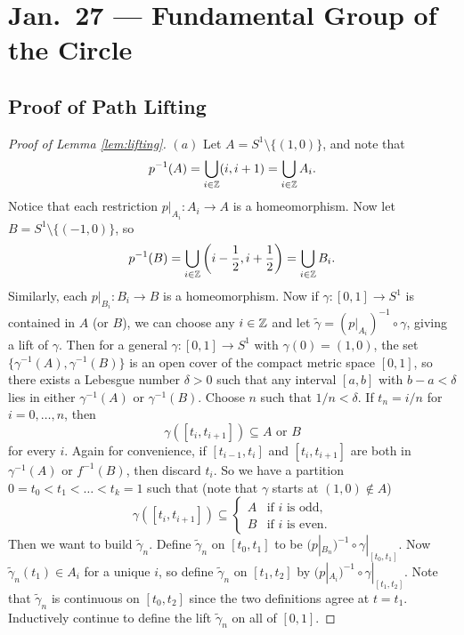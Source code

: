 \chapter{Jan.~27 --- Fundamental Group of the Circle}

\section{Proof of Path Lifting}

\begin{proof}[Proof of Lemma \ref{lem:lifting}]
  $(a)$ Let $A = S^1 \setminus \{(1, 0)\}$, and note that
  \[
    p^{-1}(A) = \bigcup_{i \in \mathbb{Z}} (i, i + 1) = \bigcup_{i \in \mathbb{Z}} A_i.
  \]
  Notice that each restriction
  $p|_{A_i} : A_i \to A$ is a homeomorphism.
  Now let $B = S^1 \setminus \{(-1, 0)\}$, so
  \[
    p^{-1}(B) = \bigcup_{i \in \mathbb{Z}} \left(i - \frac{1}{2}, i + \frac{1}{2}\right)
    = \bigcup_{i \in \mathbb{Z}} B_i.
  \]
  Similarly, each $p|_{B_i} : B_i \to B$ is a
  homeomorphism. Now if $\gamma : [0, 1] \to S^1$ is
  contained in $A$ (or $B$), we can choose any $i \in \mathbb{Z}$
  and let $\widetilde{\gamma} = (p|_{A_i})^{-1} \circ \gamma$,
  giving a lift of $\gamma$. Then for a general
  $\gamma : [0, 1] \to S^1$ with $\gamma(0) = (1, 0)$,
  the set $\{\gamma^{-1}(A), \gamma^{-1}(B)\}$ is
  an open cover of the compact metric space $[0, 1]$,
  so there exists a Lebesgue number $\delta > 0$
  such that any interval $[a, b]$ with $b - a < \delta$
  lies in either $\gamma^{-1}(A)$ or $\gamma^{-1}(B)$.
  Choose $n$ such that $1 / n < \delta$. If
  $t_n = i / n$ for $i = 0, \dots, n$, then
  \[
    \gamma([t_i, t_{i + 1}]) \subseteq A \text{ or } B
  \]
  for every $i$. Again for convenience, if
  $[t_{i - 1}, t_i]$ and $[t_i, t_{i + 1}]$ are
  both in $\gamma^{-1}(A)$ or $f^{-1}(B)$, then
  discard $t_i$. So we have a partition
  $0 = t_0 < t_1 < \dots < t_k = 1$ such that
  (note that $\gamma$ starts at $(1, 0) \notin A$)
  \[
    \gamma([t_i, t_{i + 1}]) \subseteq
    \begin{cases}
      A & \text{if } i \text{ is odd}, \\
      B & \text{if } i \text{ is even}.
    \end{cases}
  \]
  Then we want to build $\widetilde{\gamma}_n$.
  Define $\widetilde{\gamma}_n$ on $[t_0, t_1]$
  to be $(p|_{B_n})^{-1} \circ \gamma|_{[t_0, t_1]}$.
  Now $\widetilde{\gamma}_n(t_1) \in A_i$ for a
  unique $i$, so define $\widetilde{\gamma}_n$
  on $[t_1, t_2]$ by $(p|_{A_i})^{-1} \circ \gamma|_{[t_1, t_2]}$.
  Note that $\widetilde{\gamma}_n$ is continuous
  on $[t_0, t_2]$ since the two definitions agree
  at $t = t_1$.
  Inductively continue to define the lift
  $\widetilde{\gamma}_n$ on all of $[0, 1]$.


\end{proof}

